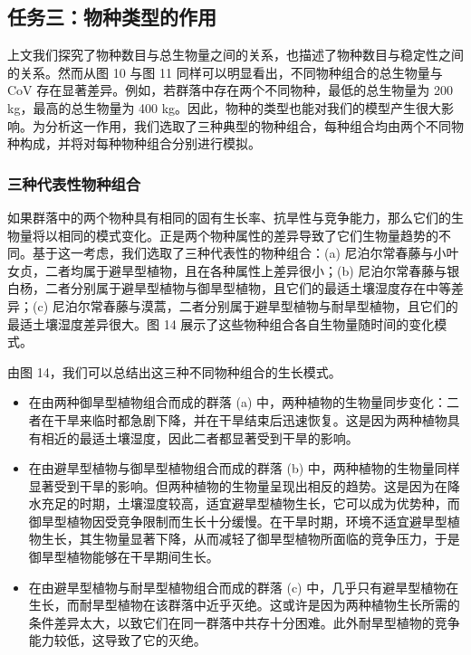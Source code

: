 \documentclass[11pt,a4paper]{ctexart}
\begin{document}
\subsection{任务三：物种类型的作用}

上文我们探究了物种数目与总生物量之间的关系，也描述了物种数目与稳定性之间的关系。然而从图 10 与图 11 同样可以明显看出，不同物种组合的总生物量与 CoV 存在显著差异。例如，若群落中存在两个不同物种，最低的总生物量为 200 kg，最高的总生物量为 400 kg。因此，物种的类型也能对我们的模型产生很大影响。为分析这一作用，我们选取了三种典型的物种组合，每种组合均由两个不同物种构成，并将对每种物种组合分别进行模拟。

\subsubsection{三种代表性物种组合}

如果群落中的两个物种具有相同的固有生长率、抗旱性与竞争能力，那么它们的生物量将以相同的模式变化。正是两个物种属性的差异导致了它们生物量趋势的不同。基于这一考虑，我们选取了三种代表性的物种组合：(a) 尼泊尔常春藤与小叶女贞，二者均属于避旱型植物，且在各种属性上差异很小；(b) 尼泊尔常春藤与银白杨，二者分别属于避旱型植物与御旱型植物，且它们的最适土壤湿度存在中等差异；(c) 尼泊尔常春藤与漠蒿，二者分别属于避旱型植物与耐旱型植物，且它们的最适土壤湿度差异很大。图 14 展示了这些物种组合各自生物量随时间的变化模式。

由图 14，我们可以总结出这三种不同物种组合的生长模式。

\begin{itemize}
\item 在由两种御旱型植物组合而成的群落 (a) 中，两种植物的生物量同步变化：二者在干旱来临时都急剧下降，并在干旱结束后迅速恢复。这是因为两种植物具有相近的最适土壤湿度，因此二者都显著受到干旱的影响。
\item 在由避旱型植物与御旱型植物组合而成的群落 (b) 中，两种植物的生物量同样显著受到干旱的影响。但两种植物的生物量呈现出相反的趋势。这是因为在降水充足的时期，土壤湿度较高，适宜避旱型植物生长，它可以成为优势种，而御旱型植物因受竞争限制而生长十分缓慢。在干旱时期，环境不适宜避旱型植物生长，其生物量显著下降，从而减轻了御旱型植物所面临的竞争压力，于是御旱型植物能够在干旱期间生长。
\item 在由避旱型植物与耐旱型植物组合而成的群落 (c) 中，几乎只有避旱型植物在生长，而耐旱型植物在该群落中近乎灭绝。这或许是因为两种植物生长所需的条件差异太大，以致它们在同一群落中共存十分困难。此外耐旱型植物的竞争能力较低，这导致了它的灭绝。
\end{itemize}
\end{document}
